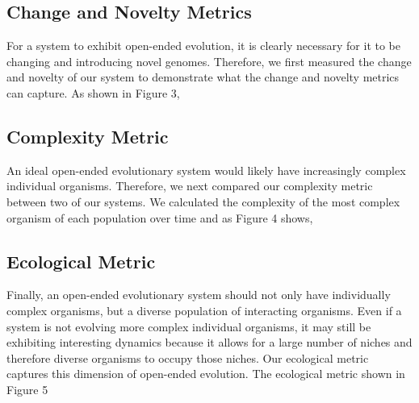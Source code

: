 \documentclass[letterpaper]{article}
\begin{document}
\subsection{Change and Novelty Metrics}
For a system to exhibit open-ended evolution, it is clearly necessary for it to be changing and introducing novel genomes. Therefore, we first measured the change and novelty of our system to demonstrate what the change and novelty metrics can capture. As shown in Figure 3,



\subsection{Complexity Metric}
    An ideal open-ended evolutionary system would likely have increasingly complex individual organisms. Therefore, we next compared our complexity metric between two of our systems. We calculated the complexity of the most complex organism of each population over time and as Figure 4 shows,


\subsection{Ecological Metric}
Finally, an open-ended evolutionary system should not only have individually complex organisms, but a diverse population of interacting organisms. Even if a system is not evolving more complex individual organisms, it may still be exhibiting interesting dynamics because it allows for a large number of niches and therefore diverse organisms to occupy those niches. Our ecological metric captures this dimension of open-ended evolution. The ecological metric shown in Figure 5 
\end{document}
